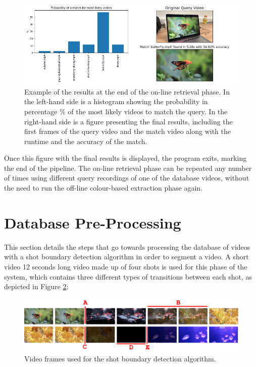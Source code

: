 \begin{figure}[h] 
\centerline{\includegraphics[width=\textwidth]{figures/implementation/online-retrieval-results.png}}
\caption{\label{fig:implementation-online-retrieval-results}Example of the results at the end of the on-line retrieval phase. In the left-hand side is a histogram showing the probability in percentage \% of the most likely videos to match the query. In the right-hand side is a figure presenting the final results, including the first frames of the query video and the match video along with the runtime and the accuracy of the match.}
\end{figure}

Once this figure with the final results is displayed, the program exits, marking the end of the pipeline. The on-line retrieval phase can be repeated any number of times using different query recordings of one of the database videos, without the need to run the off-line colour-based extraction phase again.


\section{Database Pre-Processing}
\label{sec:database-pre-processing}

This section details the steps that go towards processing the database of videos with a shot boundary detection algorithm in order to segment a video. A short video 12 seconds long video made up of four shots is used for this phase of the system, which contains three different types of transitions between each shot, as depicted in Figure \ref{fig:shot_boundary_detection_frames}:

\begin{figure}[h] 
\centerline{\includegraphics[width=\textwidth]{figures/implementation/shot_boundary_detection_frames.png}}
\caption{\label{fig:shot_boundary_detection_frames}Video frames used for the shot boundary detection algorithm.}
\end{figure}

